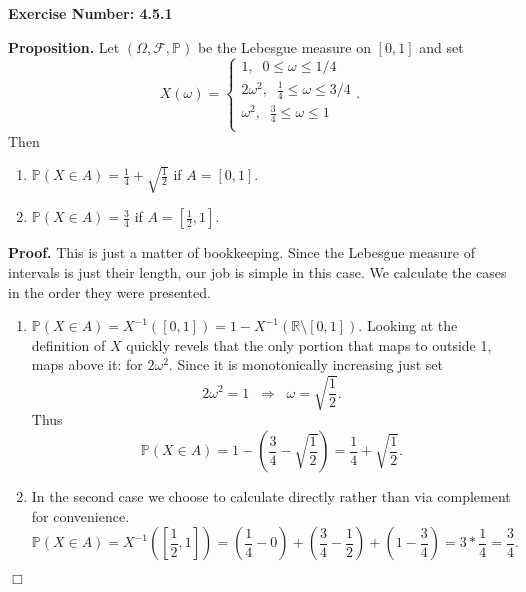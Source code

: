 \documentclass{article}
\begin{document}
\noindent \textbf{Exercise Number: 4.5.1}  %

\medskip 

\noindent \textbf{Proposition.} Let $(\Omega, \mathcal{F}, \mathbb{P})$ be the Lebesgue measure on $[0,1]$ and set \[X(\omega) = \begin{cases}
                                    1, \;\; 0 \leq \omega \leq 1/4 \\
                                    2\omega^2, \;\; \frac{1}{4} \leq \omega \leq 3/4 \\
                                    \omega^2, \;\; \frac{3}{4} \leq \omega \leq 1 \\
                                    \end{cases}.\] Then 

\begin{enumerate}

\item $\mathbb{P}(X \in A) = \frac{1}{4} + \sqrt{\frac{1}{2}}$ if $A = [0,1]$. 

\item $\mathbb{P}(X \in A) = \frac{3}{4}$  if $A = [\frac{1}{2}, 1]$.

\end{enumerate}

\bigskip

\noindent \textbf{Proof.} This is just a matter of bookkeeping. Since the Lebesgue measure of
intervals is just their length, our job is simple in this case. We calculate the cases in the
order they were presented.  

\begin{enumerate}

\item $\mathbb{P}(X \in A) = X^{-1}([0,1]) = 1 - X^{-1}(\mathbb{R} \setminus [0,1])$. Looking at 
the definition of $X$ quickly revels that the only portion that maps to outside 1, maps above it:
for $2\omega^2$. Since it is monotonically increasing just set \[2\omega^2 = 1 \;\; \Rightarrow \;\; \omega = \sqrt{\frac{1}{2}}.\] Thus \[\mathbb{P}(X \in A) = 1 - (\frac{3}{4} - \sqrt{\frac{1}{2}}) = \frac{1}{4} + \sqrt{\frac{1}{2}}.\] 

\item In the second case we choose to calculate directly rather than via complement for convenience. \[\mathbb{P}(X \in A) = X^{-1}([\frac{1}{2},1]) = (\frac{1}{4} - 0) + (\frac{3}{4} - \frac{1}{2}) + (1 - \frac{3}{4}) = 3 * \frac{1}{4} = \frac{3}{4}.\] 

\end{enumerate}  


\hfill $\Box$
\end{document}
